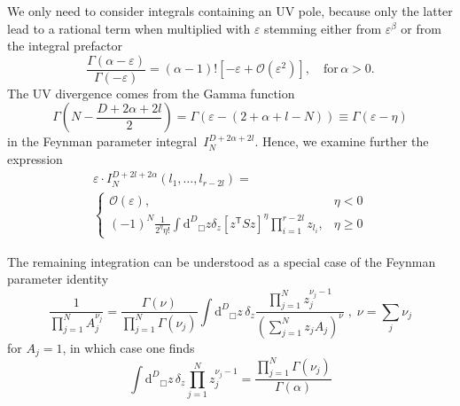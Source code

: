 \documentclass[11pt,a4paper]{refrep}
\newcommand{\diff}[1][{}]{{\mathrm{d}}^{#1}\!}
\begin{document}
We only need to consider integrals containing an UV pole, because only the latter lead to
a rational term when multiplied with $\varepsilon$ stemming either from
$\varepsilon^\beta$ or from the integral prefactor
\begin{equation}
\frac{\Gamma(\alpha-\varepsilon)}{\Gamma(-\varepsilon)}=
(\alpha-1)!\left[-\varepsilon +{\mathcal O}(\varepsilon^2)\right],
\quad\text{for}\,\alpha>0.
\end{equation}
The UV divergence comes from the Gamma function
\begin{equation}
\Gamma\left(N-\frac{D+2\alpha+2l}2\right)=
\Gamma(\varepsilon-(2+\alpha+l-N))\equiv\Gamma(\varepsilon-\eta)
\end{equation}
in the Feynman parameter integral~$I_N^{D+2\alpha+2l}$.
Hence, we examine further the expression
\begin{multline}
\varepsilon\cdot I_N^{D+2l+2\alpha}(l_1,\ldots, l_{r-2l})=\\
\left\{\begin{array}{lr}
{\mathcal O}(\varepsilon),&\eta<0\\
(-1)^N\frac1{2^\eta\eta!}\int\diff[D]_\Box\!z\delta_z
\left[z^{\mathsf{T}}Sz\right]^\eta
\prod_{i=1}^{r-2l}z_{l_i},&\eta\geq0
\end{array}\right.
\end{multline}

The remaining integration can be understood as a special case of the
Feynman parameter identity
\begin{equation}
\frac{1}{\prod_{j=1}^N A_j^{\nu_j}}=\frac{\Gamma(\nu)}{
\prod_{j=1}^N \Gamma(\nu_j)}\int\!\diff[D]_\Box\!z\,\delta_z
\frac{\prod_{j=1}^N z_j^{\nu_j-1}}{\left(
\sum_{j=1}^N z_j A_j\right)^\nu}\; , \; \nu=\sum_j \nu_j
\end{equation}
for $A_j=1$, in which case one finds
\begin{equation}
\int\!\diff[D]_\Box\!z\,\delta_z
\prod_{j=1}^N z_j^{\nu_j-1}=\frac{\prod_{j=1}^N \Gamma(\nu_j)}%
{\Gamma(\alpha)}
\end{equation}
\end{document}
